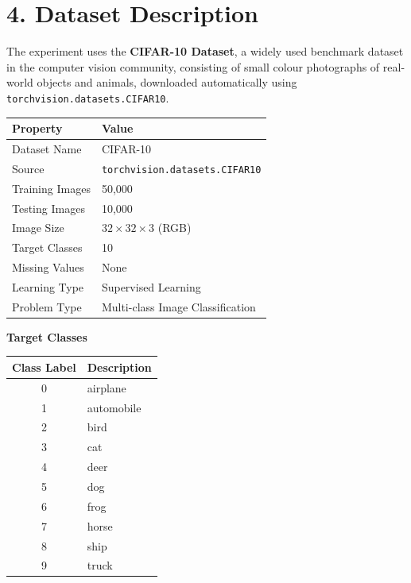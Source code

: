 \documentclass[11pt,a4paper]{article}
\begin{document}
\section*{4. Dataset Description}

The experiment uses the \textbf{CIFAR-10 Dataset}, a widely used benchmark dataset in the computer vision community, consisting of small colour photographs of real-world objects and animals, downloaded automatically using \texttt{torchvision.datasets.CIFAR10}.

\vspace{0.3cm}

\begin{center}
\begin{tabular}{|p{5cm}|p{7cm}|}
\hline
\textbf{Property} & \textbf{Value}\\
\hline
Dataset Name & CIFAR-10\\
\hline
Source & \texttt{torchvision.datasets.CIFAR10}\\
\hline
Training Images & 50{,}000\\
\hline
Testing Images & 10{,}000\\
\hline
Image Size & $32 \times 32 \times 3$ (RGB)\\
\hline
Target Classes & 10\\
\hline
Missing Values & None\\
\hline
Learning Type & Supervised Learning\\
\hline
Problem Type & Multi-class Image Classification\\
\hline
\end{tabular}
\end{center}

\vspace{0.15cm}
\textbf{Target Classes}

\begin{center}
\begin{tabular}{|c|p{9cm}|}
\hline
\textbf{Class Label} & \textbf{Description}\\
\hline
0 & airplane\\
\hline
1 & automobile\\
\hline
2 & bird\\
\hline
3 & cat\\
\hline
4 & deer\\
\hline
5 & dog\\
\hline
6 & frog\\
\hline
7 & horse\\
\hline
8 & ship\\
\hline
9 & truck\\
\hline
\end{tabular}
\end{center}
\end{document}
